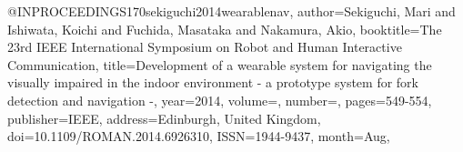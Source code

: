 @INPROCEEDINGS{170sekiguchi2014wearablenav,
author={Sekiguchi, Mari and Ishiwata, Koichi and Fuchida, Masataka and Nakamura, Akio},
booktitle={The 23rd IEEE International Symposium on Robot and Human Interactive Communication}, 
title={Development of a wearable system for navigating the visually impaired in the indoor environment - a prototype system for fork detection and navigation -}, 
year={2014},
volume={},
number={},
pages={549-554},
publisher={IEEE},
address={Edinburgh, United Kingdom},
doi={10.1109/ROMAN.2014.6926310},
ISSN={1944-9437},
month={Aug},}
